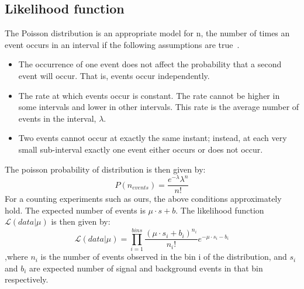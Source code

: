 \subsection{Likelihood function}
The Poisson distribution is an appropriate model for n, the number of times an event occurs in an interval if the following assumptions are true~\cite{poisson_wiki}.
\begin{itemize}
\item The occurrence of one event does not affect the probability that a second event will occur. That is, events occur independently.
\item The rate at which events occur is constant. The rate cannot be higher in some intervals and lower in other intervals. This rate is the average number of events in the interval, $\lambda$.
\item Two events cannot occur at exactly the same instant; instead, at each very small sub-interval exactly one event either occurs or does not occur.
\end{itemize}
The poisson probability of distribution is then given by:
\begin{equation}
  P(n_{events})=\frac{e^{-\lambda}\lambda^{n}}{n!}
\end{equation}
For a counting experiments such as ours, the above conditions approximately hold. The expected number of events is $\mu\cdot s + b$. The likelihood function $\mathcal{L}(data|\mu)$ is then given by:
\begin{equation}
  \mathcal{L}(data|\mu)=\prod_{i=1}^{bins}\frac{(\mu\cdot s_i + b_i)^{n_i}}{n_{i}!}e^{-\mu\cdot s_i - b_i}
\end{equation}
,where $n_i$ is the number of events observed in the bin i of the distribution, and $s_i$ and $b_i$ are expected number of signal and background events in that bin respectively.


